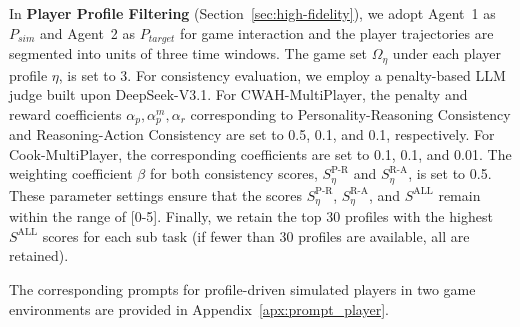 \documentclass{article}
\theoremstyle{plain}
\theoremstyle{definition}
\theoremstyle{remark}
\begin{document}
In \textbf{Player Profile Filtering} (Section~\ref{sec:high-fidelity}), we adopt Agent~1 as $P_{sim}$ and Agent~2 as $P_{target}$ for game interaction and the player trajectories are segmented into units of three time windows. The game set $\Omega_{\eta}$ under each player profile $\eta$, is set to 3. For consistency evaluation, we employ a penalty-based LLM judge built upon DeepSeek-V3.1. For CWAH-MultiPlayer, the penalty and reward coefficients $\alpha_p, \alpha_p^m, \alpha_r$ corresponding to Personality-Reasoning Consistency and Reasoning-Action Consistency are set to 0.5, 0.1, and 0.1, respectively. For Cook-MultiPlayer, the corresponding coefficients are set to 0.1, 0.1, and 0.01. The weighting coefficient $\beta$ for both consistency scores, ${S}^{\text{P-R}}_{\eta}$ and ${S}^{\text{R-A}}_{\eta}$, is set to 0.5. These parameter settings ensure that the scores ${S}^{\text{P-R}}_{\eta}$, ${S}^{\text{R-A}}_{\eta}$, and ${S}^{\text{ALL}}$ remain within the range of [0-5]. Finally, we retain the top 30 profiles with the highest ${S}^{\text{ALL}}$ scores for each sub task (if fewer than 30 profiles are available, all are retained).

The corresponding prompts for profile-driven simulated players in two game environments are provided in Appendix~\ref{apx:prompt_player}.
\end{document}
